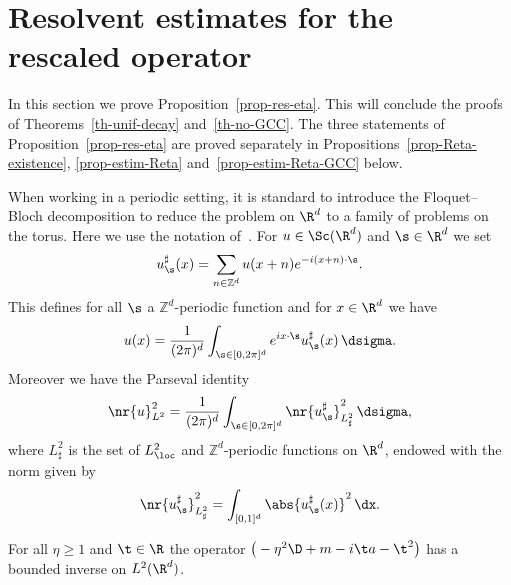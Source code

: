 \section{Resolvent estimates for the rescaled operator} \label{sec-resolvent-L2}

In this section we prove Proposition~\ref{prop-res-eta}. This will conclude the proofs of Theorems~\ref{th-unif-decay} and~\ref{th-no-GCC}. The three statements of Proposition~\ref{prop-res-eta} are proved separately in Propositions~\ref{prop-Reta-existence}, \ref{prop-estim-Reta} and~\ref{prop-estim-Reta-GCC} below.%

When working in a periodic setting, it is standard to introduce the Floquet--Bloch decomposition to reduce the problem on $\R^d$ to a family of problems on the torus. Here we use the notation of~\cite{JolyRo18}. For $u \in \Sc(\R^d)$ and $\s \in \R^d$ we set
\[
u^\sharp_\s (x) = \sum_{n \in \mathbb Z^d} u(x + n) e^{-i(x+n)\cdot \s}.
\]
This defines for all $\s$ a $\mathbb Z^d$-periodic function and for $x \in \R^d$ we have
\[
u(x) = \frac 1 {(2\pi)^d} \int_{\s \in [0,2\pi]^d} e^{ix\cdot \s} u^\sharp_\s(x) \, \dsigma.
\]
Moreover we have the Parseval identity
\[
\nr{u}_{L^2}^2 = \frac 1 {(2\pi)^d} \int_{\s \in [0,2\pi]^d} \nr{u_\s^\sharp}_{L^2_\sharp}^2 \, \dsigma,
\]
where $L^2_\sharp$ is the set of $L^2_\loc$ and $\mathbb Z^d$-periodic functions on $\R^d$, endowed with the norm given by
\[
\nr{u_\s^\sharp}_{L^2_\sharp}^2 = \int_{[0,1]^d} \abs{u_\s^\sharp(x)}^2 \, \dx.
\]

\begin{prop}\label{prop-Reta-existence}
For all $\eta \geq 1$ and $\t \in \R$ the operator $\big(-\eta^2 \D + m - i\t a - \t^2 \big)$ has a bounded inverse on $L^2(\R^d)$.
\end{prop}

